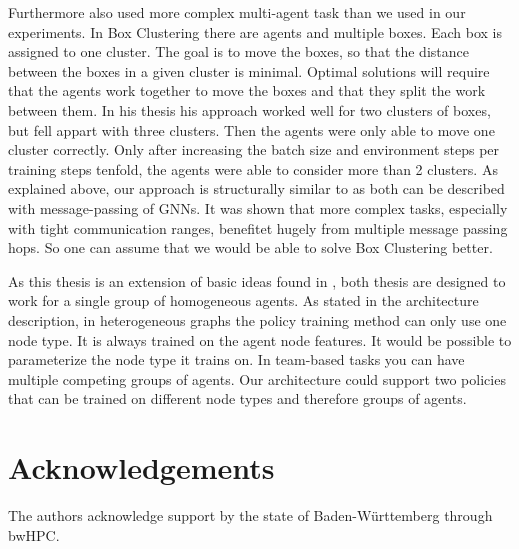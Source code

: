 Furthermore \citet{RobinRuede2021} also used more complex multi-agent task than we used in our experiments. In Box Clustering there are agents and multiple boxes. Each box is assigned to one cluster. The goal is to move the boxes, so that the distance between the boxes in a given cluster is minimal. Optimal solutions will require that the agents work together to move the boxes and that they split the work between them. In his thesis his approach worked well for two clusters of boxes, but fell appart with three clusters. Then the agents were only able to move one cluster correctly. Only after increasing the batch size and environment steps per training steps tenfold, the agents were able to consider more than 2 clusters. As explained above, our approach is structurally similar to \citet{RobinRuede2021} as both can be described with message-passing of GNNs. It was shown that more complex tasks, especially with tight communication ranges, benefitet hugely from multiple message passing hops. So one can assume that we would be able to solve Box Clustering better.\par

As this thesis is an extension of basic ideas found in \citet{RobinRuede2021}, both thesis are designed to work for a single group of homogeneous agents. As stated in the architecture description, in heterogeneous graphs the policy training method can only use one node type. It is always trained on the agent node features. It would be possible to parameterize the node type it trains on. In team-based tasks you can have multiple competing groups of agents. Our architecture could support two policies that can be trained on different node types and therefore groups of agents. \par

\iffalse
a
Data pre processing:
Wobei ein MLP Encoder bei uns auch was ist, was man ausprobieren kann. Theoretisch ist das nicht notwendig, aber praktisch spart man sich damit vielleicht ein oder zwei GNN Blöcke. Das und andere initiale Encodings kannst du gerne als Future work reintun. Dazu gibt es einen ganzen Satz Paper, die ihren Input bspw. gelernt, mittels Sinuiden oder Random Fourier Features encoden, bevor das eigentliche Netz anfängt. Wenn du magst schick ich dir zwei drei Referenzen, die du in dem Kontext zitieren kannst

https://arxiv.org/pdf/2003.08934.pdf Macht positional encoding für "synthesizing novel views of complex scenes". Figure 4 zeigt ein Beispiel, wie die Methode mit und ohne Encoding aussieht.
https://arxiv.org/pdf/2006.09661.pdf Nutzen sinus-Aktivierungen für implicit representations. Das ist bspw. sowas, wie ein Bild als Funktion zu Enkodieren ("B(x,y)=(r,g,b)") und das in den Gewichten eines neuronalen Netzes zu lernen
https://arxiv.org/abs/2006.10739 Zeigt, dass ein Fourier Feature Mapping dazu führt, dass Netze viel besser darin werden, Details in örtlich benachbarten Bereichen auf Bildern zu differenzieren.

\fi

\section{Acknowledgements}
The authors acknowledge support by the state of Baden-Württemberg through bwHPC.